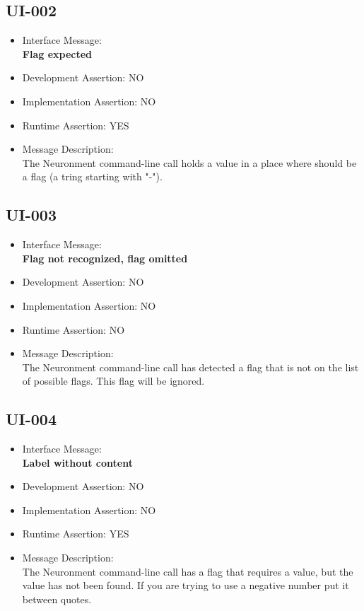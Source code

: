 \subsection{UI-002}
\begin{itemize}
  \item Interface Message:\\[1em]
    \textbf{Flag expected}
  \item Development Assertion: NO
  \item Implementation Assertion: NO
  \item Runtime Assertion: YES
  \item Message Description:\\[1em]
    The Neuronment command-line call holds a value in a place where should be a flag (a tring starting with "-").
\end{itemize}

\subsection{UI-003}
\begin{itemize}
  \item Interface Message:\\[1em]
    \textbf{Flag not recognized, flag omitted}
  \item Development Assertion: NO
  \item Implementation Assertion: NO
  \item Runtime Assertion: NO
  \item Message Description:\\[1em]
    The Neuronment command-line call has detected a flag that is not on the list of possible flags. This flag will be ignored.
\end{itemize}

\subsection{UI-004}
\begin{itemize}
  \item Interface Message:\\[1em]
    \textbf{Label without content}
  \item Development Assertion: NO
  \item Implementation Assertion: NO
  \item Runtime Assertion: YES
  \item Message Description:\\[1em]
    The Neuronment command-line call has a flag that requires a value, but the value has not been found. If you are trying to use a negative number put it between quotes.
\end{itemize}

